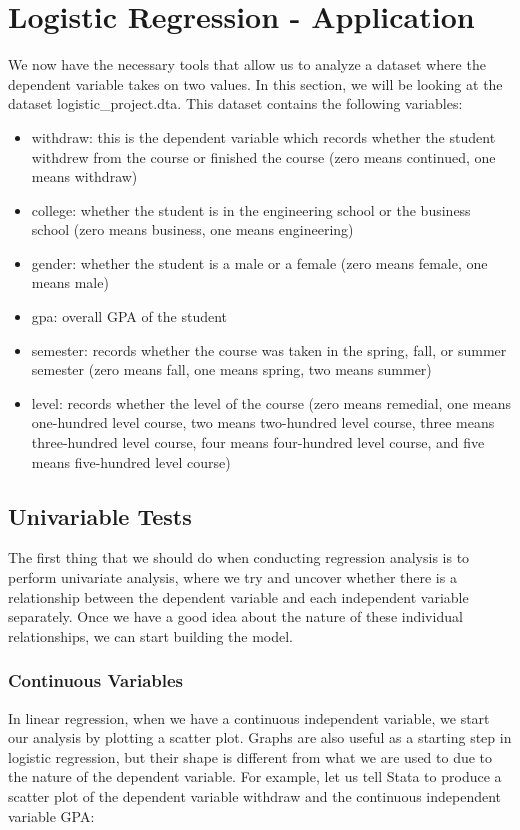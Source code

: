 \documentclass[a4paper,12pt,oneside]{book}
\begin{document}
\chapter{Logistic Regression - Application}
We now have the necessary tools that allow us to analyze a dataset where the dependent variable takes on two values. In this section, we will be looking at the dataset logistic\_project.dta. This dataset contains the 
following variables:
\begin{itemize}
	\item withdraw: this is the dependent variable which records whether the student withdrew from the course or finished the course (zero means continued, one means withdraw)
	\item college: whether the student is in the engineering school or the business school (zero means business, one means engineering)
	\item gender: whether the student is a male or a female (zero means female, one means male)
	\item gpa: overall GPA of the student
	\item semester: records whether the course was taken in the spring, fall, or summer semester (zero means fall, one means spring, two means summer)
	\item level: records whether the level of the course (zero means remedial, one means one-hundred level course, two means two-hundred level course, three means three-hundred level course, 
			four means four-hundred level course, and five means five-hundred level course)
\end{itemize}
\section{Univariable Tests}
The first thing that we should do when conducting regression analysis is to perform univariate analysis, where we try and uncover whether there is a relationship between the dependent variable and each independent 
variable separately. Once we have a good idea about the nature of these individual relationships, we can start building the model.
\subsection{Continuous Variables}
In linear regression, when we have a continuous independent variable, we start our analysis by plotting a scatter plot. Graphs are also useful as a starting step in logistic regression, but their shape is 
different from what we are used to due to the nature of the dependent variable. For example, let us tell Stata to produce a scatter plot of the dependent variable withdraw and the continuous independent variable GPA:
\end{document}
